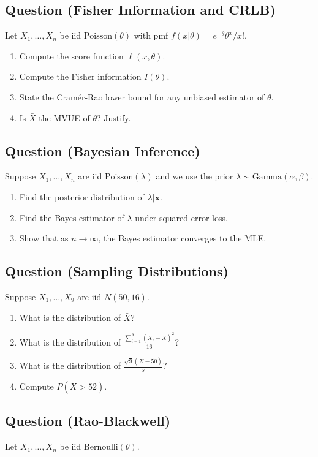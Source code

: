 \documentclass[11pt]{article}
\newcounter{qnum}
\newcommand{\question}[1]{\stepcounter{qnum}\subsection*{Question \theqnum \quad (#1)}}
\begin{document}
\vspace{3in}

\question{Fisher Information and CRLB}
Let $X_1, \ldots, X_n$ be iid $\text{Poisson}(\theta)$ with pmf $f(x|\theta) = e^{-\theta}\theta^x / x!$.

\begin{enumerate}[label=(\alph*)]
\item Compute the score function $\dot\ell(x, \theta)$.
\item Compute the Fisher information $I(\theta)$.
\item State the Cram\'er-Rao lower bound for any unbiased estimator of $\theta$.
\item Is $\bar X$ the MVUE of $\theta$? Justify.
\end{enumerate}

\vspace{3in}

\question{Bayesian Inference}
Suppose $X_1, \ldots, X_n$ are iid $\text{Poisson}(\lambda)$ and we use the prior $\lambda \sim \text{Gamma}(\alpha, \beta)$.

\begin{enumerate}[label=(\alph*)]
\item Find the posterior distribution of $\lambda | \mathbf{x}$.
\item Find the Bayes estimator of $\lambda$ under squared error loss.
\item Show that as $n \to \infty$, the Bayes estimator converges to the MLE.
\end{enumerate}

\vspace{3in}

\question{Sampling Distributions}
Suppose $X_1, \ldots, X_9$ are iid $N(50, 16)$.

\begin{enumerate}[label=(\alph*)]
\item What is the distribution of $\bar X$?
\item What is the distribution of $\frac{\sum_{i=1}^9 (X_i - \bar X)^2}{16}$?
\item What is the distribution of $\frac{\sqrt{9}(\bar X - 50)}{s}$?
\item Compute $P(\bar X > 52)$.
\end{enumerate}

\vspace{3in}

\question{Rao-Blackwell}
Let $X_1, \ldots, X_n$ be iid $\text{Bernoulli}(\theta)$.
\end{document}
